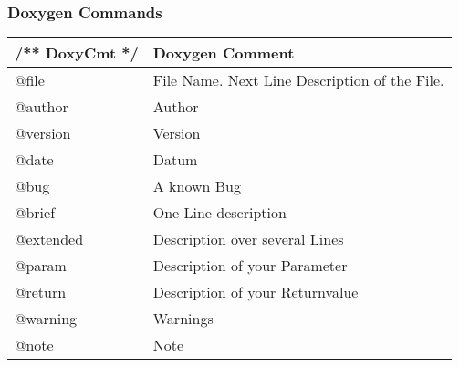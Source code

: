 \subsubsection{Doxygen Commands}
\renewcommand{\arraystretch}{1.5}
\begin{tabular}{|l|l|}
	\hline	/** DoxyCmt */  &  Doxygen Comment\\ 
	\hline	@file	      	& File Name. Next Line Description of the File.\\
	\hline	@author 	    & Author\\
	\hline	@version	    & Version \\
	\hline   @date		    & Datum   \\ 
	\hline   @bug    		& A known Bug \\
	\hline   @brief	    	& One Line description  \\
	\hline   @extended	    & Description over several Lines  \\
	\hline   @param	       	& Description of your Parameter  \\
	\hline   @return	    & Description of your Returnvalue     \\ 
	\hline   @warning	    & Warnings \\ 
	\hline   @note		    & Note\\ 
	\hline        
\end{tabular}

